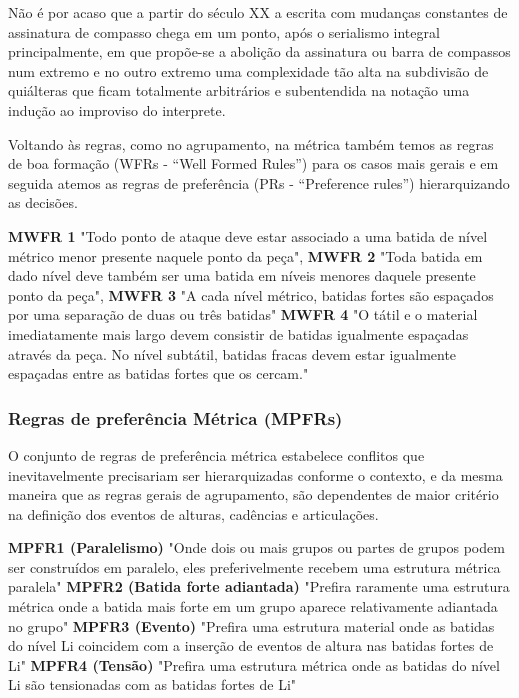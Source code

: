 \documentclass[
	12pt,				%
	openright,			%
	twoside,			%
	a4paper,			%
	english,			%
	french,				%
	spanish,			%
	brazil				%
	]{abntex2}
\begin{document}
Não é por acaso que a partir do século XX a escrita com mudanças constantes de assinatura de compasso chega em um ponto, após o serialismo integral principalmente, em que propõe-se a abolição da assinatura ou barra de compassos num extremo e no outro extremo uma complexidade tão alta na subdivisão de quiálteras que ficam totalmente arbitrários e subentendida na notação uma indução ao improviso do interprete.

Voltando às regras, como no agrupamento, na métrica também temos as regras de boa formação (WFRs - “Well Formed Rules”) para os casos mais gerais e em seguida atemos as regras de preferência (PRs - “Preference rules”) hierarquizando as decisões.

\begin{citacao}
\textbf{MWFR 1 }"Todo ponto de ataque deve estar associado a uma batida de nível métrico menor presente naquele ponto da peça",  
\textbf{MWFR 2} "Toda batida em dado nível deve também ser uma batida em níveis menores daquele presente ponto da peça", 
\textbf{MWFR 3} "A cada nível métrico, batidas fortes são espaçados por uma separação de duas ou três batidas" 
\textbf{MWFR 4} "O tátil e o material imediatamente mais largo devem consistir de batidas igualmente espaçadas através da peça. No nível subtátil, batidas fracas devem estar igualmente espaçadas entre as batidas fortes que os cercam." 
 \cite{lerdahl1983generative}
\end{citacao} 

\subsubsection{Regras de preferência Métrica (MPFRs) } 

O conjunto de regras de preferência métrica estabelece conflitos que inevitavelmente precisariam ser hierarquizadas conforme o contexto, e da mesma maneira que as regras gerais de agrupamento, são dependentes de maior critério na definição dos eventos de alturas, cadências e articulações.

\begin{citacao}
\textbf{MPFR1 (Paralelismo) }"Onde dois ou mais grupos ou partes de grupos podem ser construídos em paralelo, eles preferivelmente recebem uma estrutura métrica paralela" 
\textbf{MPFR2 (Batida forte adiantada)} "Prefira raramente uma estrutura métrica onde a batida mais forte em um grupo aparece relativamente adiantada no grupo" 
\textbf{MPFR3 (Evento)} "Prefira uma estrutura material onde as batidas do nível Li coincidem com a inserção de eventos de altura nas batidas fortes de Li" 
\textbf{MPFR4 (Tensão)} "Prefira uma estrutura métrica onde as batidas do nível Li são tensionadas com as batidas fortes de Li" 
\end{citacao}
\end{document}

